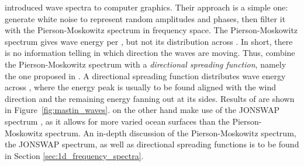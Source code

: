 \cite{Mastin:1987} introduced wave spectra to computer graphics. Their approach
is a simple one: generate white noise to represent random amplitudes and phases,
then filter it with the Pierson-Moskowitz spectrum
\citep{article:PiersonMoskowitz1964} in frequency space. The Pierson-Moskowitz
spectrum gives wave energy per \wavenumber, but not its distribution across
\wavevectors. In short, there is no information telling in which direction the
waves are moving. Thus, \citeauthor{Mastin:1987} combine the Pierson-Moskowitz
spectrum with a \emph{directional spreading function}, namely the one proposed
in \cite{article:Hasselmann1980}. A directional
spreading function distributes wave energy across \wavevectors, where
the energy peak is usually to be found aligned with the wind direction and the
remaining energy fanning out at its sides. Results of \cite{Mastin:1987} are
shown in Figure~\ref{fig:mastin_waves}.
\cite{Premoze:2000} on the other hand make use of the JONSWAP spectrum
\citep{article:Hasselman1973}, as it allows for more varied ocean surfaces than
the Pierson-Moskowitz spectrum.
An in-depth discussion of the Pierson-Moskowitz spectrum, the JONSWAP spectrum,
as well as directional spreading functions is to be found in Section
\ref{sec:1d_frequency_spectra}.

